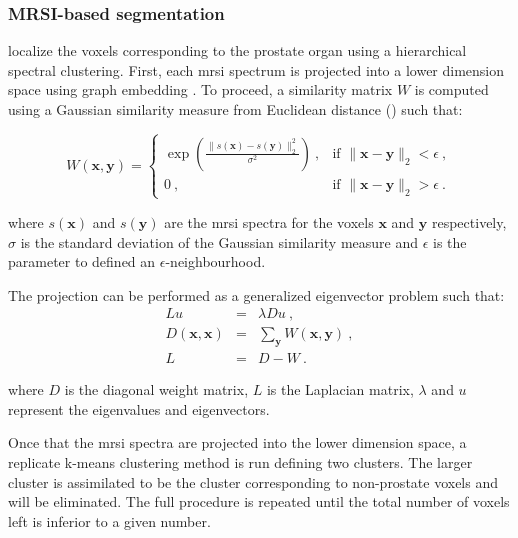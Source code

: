 \begin{enumerate}[leftmargin=*]
\end{enumerate}

\subsubsection{MRSI-based segmentation}

\cite{Tiwari2009} localize the voxels corresponding to the prostate organ using a hierarchical spectral clustering. First, each \ac{mrsi} spectrum is projected into a lower dimension space using graph embedding \cite{Shi2000}. To proceed, a similarity matrix $W$ is computed using a Gaussian similarity measure from Euclidean distance (\cite{Belkin2001}) such that:

\begin{equation}
	W(\mathbf{x},\mathbf{y}) =
	\begin{cases}	
	 	\exp \left( \frac{\| s(\mathbf{x}) - s(\mathbf{y}) \|_2^2}{\sigma^2} \right) \ , & \text{if } \| \mathbf{x} - \mathbf{y} \|_2 < \epsilon \ , \\
	 	0 \ , & \text{if } \| \mathbf{x} - \mathbf{y} \|_2 > \epsilon \ .
	 \end{cases}
	\label{eq:ge1}
\end{equation}

\noindent where $s(\mathbf{x})$ and $s(\mathbf{y})$ are the \ac{mrsi} spectra for the voxels $\mathbf{x}$ and $\mathbf{y}$ respectively, $\sigma$ is the standard deviation of the Gaussian similarity measure and $\epsilon$ is the parameter to defined an $\epsilon$-neighbourhood.

The projection can be performed as a generalized eigenvector problem such that:
\begin{eqnarray}
	Lu & = & \lambda D u \ , \nonumber \\
	D(\mathbf{x},\mathbf{x}) & = & \sum_{\mathbf{y}} W(\mathbf{x},\mathbf{y}) \ , \label{eq:ge2} \\
	L & = & D-W \ . \nonumber
\end{eqnarray}

\noindent where $D$ is the diagonal weight matrix, $L$ is the Laplacian matrix, $\lambda$ and $u$ represent the eigenvalues and eigenvectors.

Once that the \ac{mrsi} spectra are projected into the lower dimension space, a replicate k-means clustering method is run defining two clusters. The larger cluster is assimilated to be the cluster corresponding to non-prostate voxels and will be eliminated. The full procedure is repeated until the total number of voxels left is inferior to a given number.